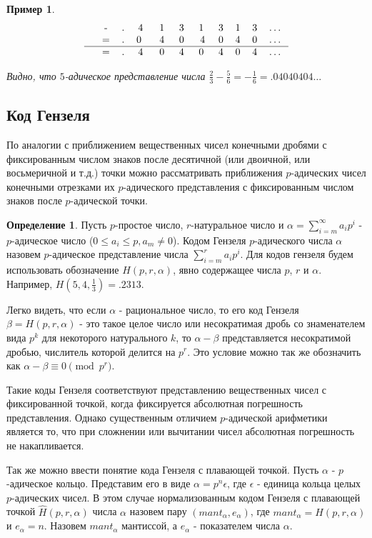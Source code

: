 \documentclass[master, och, diploma, times]{sty/SCWorks}
\theoremstyle{plain}
\newtheorem{exmp}{Пример}[section]
\theoremstyle{definition}
\newtheorem{defn}{Определение}[section]
\begin{document}
\begin{exmp}
$$
\begin{tabular}{cccccccccccc}
& - & . & 4\; & 1\; & 3\; & 1\; & 3 & 1 & 3 & \dots \\
& = & . & 0 \; & 4\; & 0\; & 4 & 0 & 4 & 0 & \dots \\
\hline
& = & . & 4\; & 0\; & 4\; & 0\; & 4 & 0 & 4 & \dots
\end{tabular}
$$

\noindent Видно, что $5$-адическое представление числа $\frac{2}{3} - \frac{5}{6}=-\frac{1}{6}=.04040404\dots$
\end{exmp}



\subsection{Код Гензеля}
По аналогии с приближением вещественных чисел конечными дробями с фиксированным числом знаков после десятичной (или двоичной, или восьмеричной и т.д.) точки можно рассматривать приближения $p$-адических чисел конечными отрезками их $p$-адического представления с фиксированным числом знаков после $p$-адической точки.

\begin{defn}
Пусть $p$-простое число, $r$-натуральное число и $\alpha=\sum\limits^{\infty}_{i=m} a_ip^i$ - $p$-адическое число ($0 \le a_i \le p, a_m \neq 0$). Кодом Гензеля $p$-адического числа $\alpha$ назовем $p$-адическое представление числа $\sum\limits_{i=m}^{r}a_ip^i$. Для кодов гензеля будем использовать обозначение $H(p,r,\alpha)$, явно содержащее числа $p$, $r$ и $\alpha$. Например, $H(5,4,\frac{1}{3})=.2313$.
\end{defn}

Легко видеть, что если $\alpha$ - рациональное число, то его код Гензеля $\beta=H(p,r, \alpha)$ - это такое целое число или несократимая дробь со знаменателем вида $p^k$ для некоторого натурального $k$, то $\alpha-\beta$ представляется несократимой дробью, числитель которой делится на $p^r$. Это условие можно так же обозначить как $\alpha - \beta \equiv 0 \pmod {p^r}$.

Такие коды Гензеля соответствуют представлению вещественных чисел с фиксированной точкой, когда фиксируется абсолютная погрешность представления. Однако существенным отличием $p$-адической арифметики является то, что при сложнении или вычитании чисел абсолютная погрешность не накапливается.

Так же можно ввести понятие кода Гензеля с плавающей точкой. Пусть $\alpha$ - $p$-адическое кольцо. Представим его в виде $\alpha=p^n\epsilon$, где $\epsilon$ - единица кольца целых $p$-адических чисел. В этом случае нормализованным кодом Гензеля с плавающей точкой $\hat H (p, r, \alpha)$ числа $\alpha$ назовем пару $(mant_{\alpha},e_{\alpha})$, где \mbox{$mant_\alpha = H(p,r,\alpha)$} и $e_\alpha=n$. Назовем $mant_\alpha$ мантиссой, а $e_\alpha$ - показателем числа $\alpha$.
\end{document}
